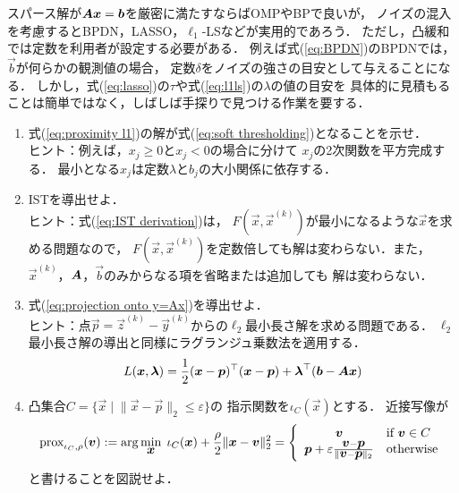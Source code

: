 スパース解が$\mbox{\boldmath $A$}\mbox{\boldmath $x$}=\mbox{\boldmath $b$}$を厳密に満たすならばOMPやBPで良いが，
ノイズの混入を考慮するとBPDN，LASSO，$\ell_1$-LSなどが実用的であろう．
ただし，凸緩和では定数を利用者が設定する必要がある．
例えば式(\ref{eq:BPDN})のBPDNでは，$\vec b$が何らかの観測値の場合，
定数$\delta$をノイズの強さの目安として与えることになる．
しかし，式(\ref{eq:lasso})の$\tau$や式(\ref{eq:l1ls})の$\lambda$の値の目安を
具体的に見積もることは簡単ではなく，しばしば手探りで見つける作業を要する．




\begin{enumerate}
\item\label{ex:soft thresholding}
式(\ref{eq:proximity l1})の解が式(\ref{eq:soft thresholding})となることを示せ．\\
ヒント：例えば，$x_j\geq 0$と$x_j<0$の場合に分けて
$x_j$の2次関数を平方完成する．
最小となる$x_j$は定数$\lambda$と$b_j$の大小関係に依存する．

\item\label{ex:IST derivation}
ISTを導出せよ．\\
ヒント：式(\ref{eq:IST derivation})は，
$F(\vec x,\vec x^{(k)})$が最小になるような$\vec x$を求める問題なので，
$F(\vec x,\vec x^{(k)})$を定数倍しても解は変わらない．また，
$\vec x^{(k)}$，$\mbox{\boldmath $A$}$，$\vec b$のみからなる項を省略または追加しても
解は変わらない．

\item\label{ex:projection onto y=Ax}
式(\ref{eq:projection onto y=Ax})を導出せよ．\\
ヒント：点$\vec p=\vec z^{(k)}-\vec y^{(k)}$からの$\ell_2$最小長さ解を求める問題である．
$\ell_2$最小長さ解の導出と同様にラグランジュ乗数法を適用する．
\[
 L(\mbox{\boldmath $x$},\mbox{\boldmath $\lambda$})=\frac{1}{2}(\mbox{\boldmath $x$}-\mbox{\boldmath $p$})^\top(\mbox{\boldmath $x$}-\mbox{\boldmath $p$})+\mbox{\boldmath $\lambda$}^\top(\mbox{\boldmath $b$}-\mbox{\boldmath $A$}\mbox{\boldmath $x$})
\]


\item
凸集合$C=\{\vec x\;|\;\|\vec x-\vec p\|_2\leq\varepsilon\}$の
指示関数を$\iota_C(\vec x)$とする．
近接写像が
\begin{equation}
 \mathop{\textrm{prox}}\nolimits_{\iota_C,\rho}(\mbox{\boldmath $v$}):=\arg\min_{\mbox{\boldmath $x$}}\; \iota_C(\mbox{\boldmath $x$})+\frac{\rho}{2}\|\mbox{\boldmath $x$}-\mbox{\boldmath $v$}\|_2^2
=
\left\{\begin{array}{cl}
\mbox{\boldmath $v$} & \mbox{if $\mbox{\boldmath $v$}\in C$}\\
\mbox{\boldmath $p$}+\varepsilon\frac{\mbox{\boldmath $v$}-\mbox{\boldmath $p$}}{\|\mbox{\boldmath $v$}-\mbox{\boldmath $p$}\|_2} & \mbox{otherwise}
\end{array}
\right.
\end{equation}
と書けることを図説せよ．



\end{enumerate}
